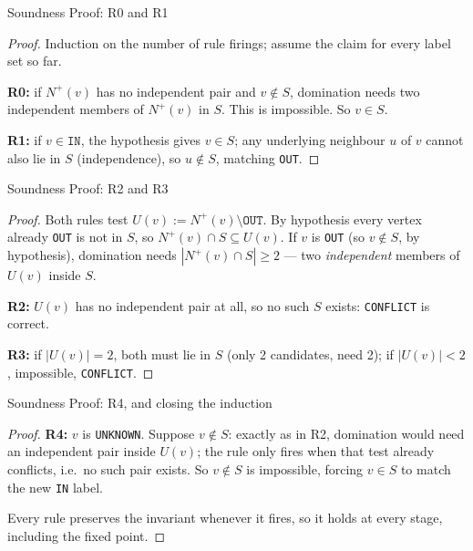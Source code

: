 \documentclass[11pt]{beamer}
\begin{document}
\begin{frame}{Soundness Proof: R0 and R1}
  \begin{proof}
    Induction on the number of rule firings; assume the claim for every label
    set so far.

    \smallskip
    \textbf{R0:} if $N^+(v)$ has no independent pair and $v\notin S$,
    domination needs two independent members of $N^+(v)$ in $S$. This is
    impossible. So $v\in S$.

    \smallskip
    \textbf{R1:} if $v\in\texttt{IN}$, the hypothesis gives $v\in S$; any
    underlying neighbour $u$ of $v$ cannot also lie in $S$ (independence), so
    $u\notin S$, matching \texttt{OUT}.
  \end{proof}
\end{frame}

\begin{frame}{Soundness Proof: R2 and R3}
  \begin{proof}
    Both rules test $U(v):=N^+(v)\setminus\texttt{OUT}$. By hypothesis every
    vertex already \texttt{OUT} is not in $S$, so $N^+(v)\cap S\subseteq
      U(v)$. If $v$ is \texttt{OUT} (so $v\notin S$, by hypothesis), domination
    needs $|N^+(v)\cap S|\ge2$ --- two \emph{independent} members of $U(v)$
    inside $S$.

    \smallskip
    \textbf{R2:} $U(v)$ has no independent pair at all, so no
    such $S$ exists: \texttt{CONFLICT} is correct.

    \smallskip
    \textbf{R3:} if $|U(v)|=2$, both must lie in $S$ (only 2 candidates,
    need 2); if $|U(v)|<2$, impossible, \texttt{CONFLICT}.
  \end{proof}
\end{frame}

\begin{frame}{Soundness Proof: R4, and closing the induction}
  \begin{proof}
    \textbf{R4:} $v$ is \texttt{UNKNOWN}. Suppose $v\notin S$: exactly as in
    R2, domination would need an independent pair inside $U(v)$; the rule
    only fires when that test already conflicts, i.e.\ no such pair exists.
    So $v\notin S$ is impossible, forcing $v\in S$ to match the new
    \texttt{IN} label.

    \smallskip
    Every rule preserves the invariant whenever it fires, so it holds at
    every stage, including the fixed point. \qedhere
  \end{proof}
\end{frame}
\end{document}
